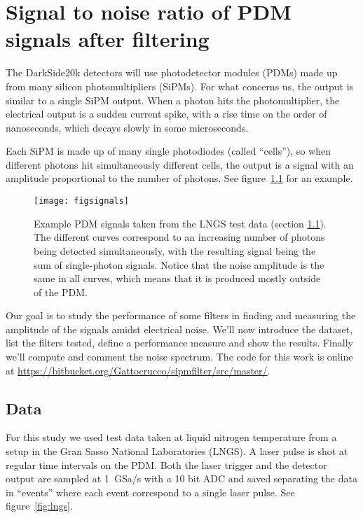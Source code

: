 \chapter{Signal to noise ratio of PDM signals after filtering}

The DarkSide20k detectors will use photodetector modules (PDMs) made up from
many silicon photomultipliers (SiPMs). For what concerns us, the output is
similar to a single SiPM output. When a photon hits the photomultiplier, the
electrical output is a sudden current spike, with a rise time on the order of
nanoseconds, which decays slowly in some microseconds.

Each SiPM is made up of many single photodiodes (called ``cells''), so when
different photons hit simultaneously different cells, the output is a signal
with an amplitude proportional to the number of photons. See
figure~\ref{fig:signals} for an example. 

\begin{figure}
    \texttt{[image: figsignals]}
    
    \caption{Example PDM signals taken from the LNGS test data (section
    \ref{sec:lngsdata}). The different curves correspond to an increasing
    number of photons being detected simultaneously, with the resulting signal
    being the sum of single-photon signals. Notice that the noise amplitude is
    the same in all curves, which means that it is produced mostly outside of
    the PDM.}
    
    \label{fig:signals}
\end{figure}

Our goal is to study the performance of some filters in finding and measuring
the amplitude of the signals amidst electrical noise. We'll now introduce the
dataset, list the filters tested, define a performance measure and show the
results. Finally we'll compute and comment the noise spectrum. The code for
this work is online at
\url{https://bitbucket.org/Gattocrucco/sipmfilter/src/master/}.

\section{Data}
\label{sec:lngsdata}

For this study we used test data taken at liquid nitrogen temperature from a
setup in the Gran Sasso National Laboratories (LNGS). A laser pulse is shot at
regular time intervals on the PDM. Both the laser trigger and the detector
output are sampled at \SI{1}{GSa/s} with a 10 bit ADC and saved separating the
data in ``events'' where each event correspond to a single laser pulse. See
figure~\ref{fig:lngs}. 

